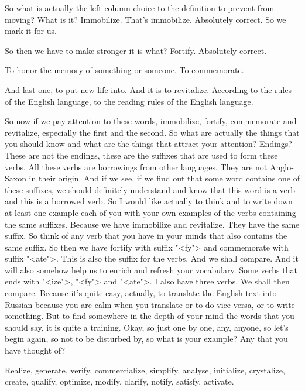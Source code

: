 \documentclass[main.tex]{subfiles}
\begin{document}
So what is actually the left column choice to the definition to prevent from moving? What is it?
Immobilize.
That's immobilize.
Absolutely correct.
So we mark it for us.

So then we have to make stronger it is what?
Fortify. Absolutely correct.

To honor the memory of something or someone.
To commemorate.

And last one, to put new life into.
And it is to revitalize.
According to the rules of the English language, to the reading rules of the English language.

So now if we pay attention to these words, immobilize, fortify, commemorate and revitalize, especially the first and the second.
So what are actually the things that you should know and what are the things that attract your attention?
Endings?
These are not the endings, these are the suffixes that are used to form these verbs.
All these verbs are borrowings from other languages.
They are not Anglo-Saxon in their origin.
And if we see, if we find out that some word contains one of these suffixes, we should definitely understand and know that this word is a verb and this is a borrowed verb.
So I would like actually to think and to write down at least one example each of you with your own examples of the verbs containing the same suffixes.
Because we have immobilize and revitalize.
They have the same suffix.
So think of any verb that you have in your minds that also contains the same suffix.
So then we have fortify with suffix "<fy"> and commemorate with suffix "<ate">.
This is also the suffix for the verbs.
And we shall compare.
And it will also somehow help us to enrich and refresh your vocabulary.
Some verbs that ends with "<ize">, "<fy"> and "<ate">.
I also have three verbs.
We shall then compare.
Because it's quite easy, actually, to translate the English text into Russian because you are calm when you translate or to do vice versa, or to write something.
But to find somewhere in the depth of your mind the words that you should say, it is quite a training.
Okay, so just one by one, any, anyone, so let's begin again, so not to be disturbed by, so what is your example? Any that you have thought of?

Realize, generate, verify, commercialize, simplify, analyse, initialize, crystalize, create, qualify, optimize, modify, clarify, notify, satisfy, activate.
\end{document}
